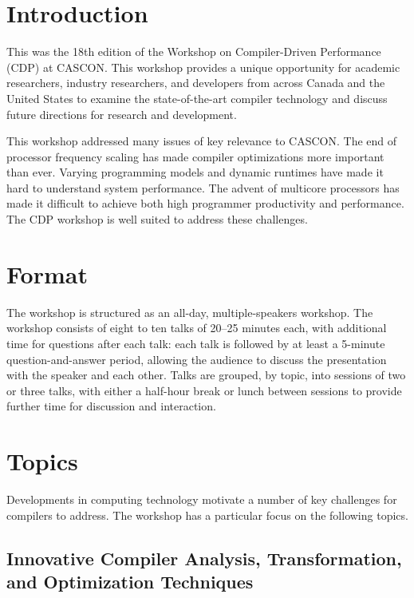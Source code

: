 \documentclass[sigconf]{acmart}
\begin{document}
\maketitle

\section{Introduction}
This was the 18th edition of the Workshop on Compiler-Driven Performance (CDP) at CASCON. This workshop provides a unique opportunity for academic researchers, industry researchers, and developers from across Canada and the United States to examine the state-of-the-art compiler technology and discuss future directions for research and development.

This workshop addressed many issues of key relevance to CASCON. The end of processor frequency scaling has made compiler optimizations more important than ever. Varying programming models and dynamic runtimes have made it hard to understand system performance. The advent of multicore processors has made it difficult to achieve both high programmer productivity and performance. The CDP workshop is well suited to address these challenges.

\section{Format}
The workshop is structured as an all-day, multiple-speakers workshop. The workshop consists of eight to ten talks of 20--25 minutes each, with additional time for questions after each talk: each talk is followed by at least a 5-minute question-and-answer period, allowing the audience to discuss the presentation with the speaker and each other. Talks are grouped, by topic, into sessions of two or three talks, with either a half-hour break or lunch between sessions to provide further time for discussion and interaction. 

\section{Topics}
Developments in computing technology motivate a number of key challenges for compilers to address. The workshop has a particular focus on the following topics.

\subsection{Innovative Compiler Analysis, Transformation, and Optimization Techniques}
\end{document}
